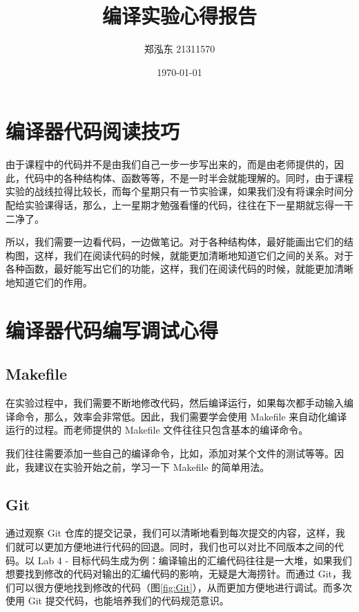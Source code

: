 \documentclass{article}
\begin{document}
\sloppy %

\title{编译实验心得报告}
\author{郑泓东 21311570}
\date{\today}

\maketitle

\section{编译器代码阅读技巧}
由于课程中的代码并不是由我们自己一步一步写出来的，而是由老师提供的，因此，代码中的各种结构体、函数等等，不是一时半会就能理解的。同时，由于课程实验的战线拉得比较长，而每个星期只有一节实验课，如果我们没有将课余时间分配给实验课得话，那么，上一星期才勉强看懂的代码，往往在下一星期就忘得一干二净了。

所以，我们需要一边看代码，一边做笔记。对于各种结构体，最好能画出它们的结构图，这样，我们在阅读代码的时候，就能更加清晰地知道它们之间的关系。对于各种函数，最好能写出它们的功能，这样，我们在阅读代码的时候，就能更加清晰地知道它们的作用。

\section{编译器代码编写调试心得}

\subsection{Makefile}
在实验过程中，我们需要不断地修改代码，然后编译运行，如果每次都手动输入编译命令，那么，效率会非常低。因此，我们需要学会使用 Makefile 来自动化编译运行的过程。而老师提供的 Makefile 文件往往只包含基本的编译命令。

我们往往需要添加一些自己的编译命令，比如，添加对某个文件的测试等等。因此，我建议在实验开始之前，学习一下 Makefile 的简单用法。

\subsection{Git}
通过观察 Git 仓库的提交记录，我们可以清晰地看到每次提交的内容，这样，我们就可以更加方便地进行代码的回退。同时，我们也可以对比不同版本之间的代码。以 Lab 4 - 目标代码生成为例：编译输出的汇编代码往往是一大堆，如果我们想要找到修改的代码对输出的汇编代码的影响，无疑是大海捞针。而通过 Git，我们可以很方便地找到修改的代码（图\ref{fig:Git}），从而更加方便地进行调试。而多次使用 Git 提交代码，也能培养我们的代码规范意识。
\end{document}

